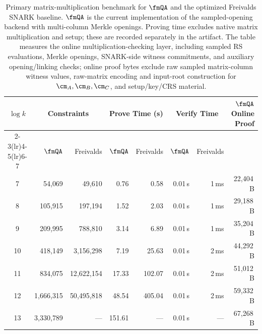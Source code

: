 \begin{table}[t]
\centering
\setlength{\tabcolsep}{4pt}
\footnotesize
\begin{tabular}{c rr rr rr r}
\toprule
\multirow{2}{*}{$\log k$}
  & \multicolumn{2}{c}{\textbf{Constraints}}
  & \multicolumn{2}{c}{\textbf{Prove Time (s)}}
  & \multicolumn{2}{c}{\textbf{Verify Time}}
  & \multirow{2}{*}{\textbf{$\fmQA$ Online Proof}} \\
\cmidrule(lr){2-3}\cmidrule(lr){4-5}\cmidrule(lr){6-7}
  & $\fmQA$ & Freivalds
  & $\fmQA$ & Freivalds
  & $\fmQA$ & Freivalds
  & \\
\midrule
7  & 54{,}069      & 49{,}610       & 0.76   & 0.58   & 0.01\,s & 1\,ms & 22{,}404\,B \\
8  & 105{,}915     & 197{,}194      & 1.52   & 2.03   & 0.01\,s & 1\,ms & 29{,}188\,B \\
9  & 209{,}995     & 788{,}810      & 3.14   & 6.89   & 0.01\,s & 1\,ms & 35{,}204\,B \\
10 & 418{,}149     & 3{,}156{,}298  & 7.19   & 25.63  & 0.01\,s & 2\,ms & 44{,}292\,B \\
11 & 834{,}075     & 12{,}622{,}154 & 17.33  & 102.07 & 0.01\,s & 2\,ms & 51{,}012\,B \\
12 & 1{,}666{,}315 & 50{,}495{,}818 & 48.54  & 405.04 & 0.01\,s & 2\,ms & 59{,}332\,B \\
13 & 3{,}330{,}789 & ---            & 151.61 & ---    & 0.01\,s & ---   & 67{,}268\,B \\
\bottomrule
\end{tabular}
\caption{Primary matrix-multiplication benchmark for $\fmQA$ and the optimized
Freivalds SNARK baseline. $\fmQA$ is the current implementation of the
sampled-opening backend with multi-column Merkle openings. Proving time excludes
native matrix multiplication and setup; these are recorded separately in the
artifact. The table measures the online multiplication-checking layer, including
sampled RS evaluations, Merkle openings, SNARK-side witness commitments, and
auxiliary opening/linking checks; online proof bytes exclude raw sampled
matrix-column witness values, raw-matrix encoding and input-root construction
for $\cm_A,\cm_B,\cm_C$, and setup/key/CRS material.}
\label{tab:meow-vs-freivalds}
\end{table}
